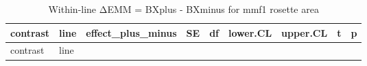 \documentclass[
  10pt,
]{article}
\begin{document}
\begin{longtable}[]{@{}
  >{\raggedright\arraybackslash}p{}
  >{\raggedright\arraybackslash}p{}
  >{\raggedleft\arraybackslash}p{}
  >{\raggedleft\arraybackslash}p{}
  >{\raggedleft\arraybackslash}p{}
  >{\raggedleft\arraybackslash}p{}
  >{\raggedleft\arraybackslash}p{}
  >{\raggedleft\arraybackslash}p{}
  >{\raggedleft\arraybackslash}p{}@{}}
\caption{Within-line ΔEMM = BXplus - BXminus for mmf1 rosette
area}\tabularnewline
\toprule\noalign{}
\begin{minipage}[b]{\linewidth}\raggedright
contrast
\end{minipage} & \begin{minipage}[b]{\linewidth}\raggedright
line
\end{minipage} & \begin{minipage}[b]{\linewidth}\raggedleft
effect\_plus\_minus
\end{minipage} & \begin{minipage}[b]{\linewidth}\raggedleft
SE
\end{minipage} & \begin{minipage}[b]{\linewidth}\raggedleft
df
\end{minipage} & \begin{minipage}[b]{\linewidth}\raggedleft
lower.CL
\end{minipage} & \begin{minipage}[b]{\linewidth}\raggedleft
upper.CL
\end{minipage} & \begin{minipage}[b]{\linewidth}\raggedleft
t
\end{minipage} & \begin{minipage}[b]{\linewidth}\raggedleft
p
\end{minipage} \\
\midrule\noalign{}
\endfirsthead
\toprule\noalign{}
\begin{minipage}[b]{\linewidth}\raggedright
contrast
\end{minipage} & \begin{minipage}[b]{\linewidth}\raggedright
line
\end{minipage} & \begin{minipage}[b]{\linewidth}\raggedleft

\end{minipage}
\end{longtable}
\end{document}
